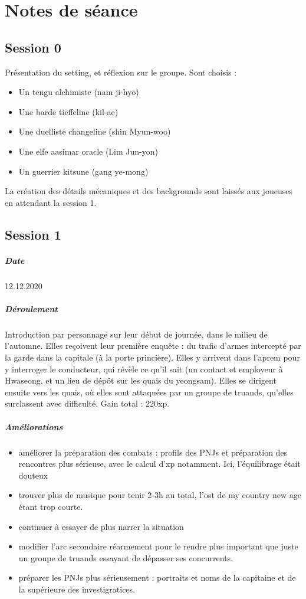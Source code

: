 \documentclass[10pt,a4paper]{book}
\begin{document}
\chapter{Notes de séance}
\section{Session 0}
Présentation du setting, et réflexion sur le groupe. Sont choisis :
\begin{itemize}
\item Un tengu alchimiste (nam ji-hyo)
\item Une barde tieffeline (kil-ae)
\item Une duelliste changeline (shin Myun-woo)
\item Une elfe aasimar oracle (Lim Jun-yon)
\item Un guerrier kitsune (gang ye-mong)
\end{itemize}
La création des détails mécaniques et des backgrounds sont laissés aux joueuses en attendant la session 1.
\section{Session 1}
\paragraph{Date}12.12.2020
\paragraph{Déroulement} Introduction par personnage sur leur début de journée, dans le milieu de l'automne. Elles reçoivent leur première enquête : du trafic d'armes intercepté par la garde dans la capitale (à la porte princière). Elles y arrivent dans l'aprem pour y interroger le conducteur, qui révèle ce qu'il sait (un contact et employeur à Hwaseong, et un lieu de dépôt sur les quais du yeongsam). Elles se dirigent ensuite vers les quais, où elles sont attaquées par un groupe de truands, qu'elles surclassent avec difficulté. Gain total : 220xp.
\paragraph{Améliorations}
\begin{itemize}
\item améliorer la préparation des combats : profils des PNJs et préparation des rencontres plus sérieuse, avec le calcul d'xp notamment. Ici, l'équilibrage était douteux
\item trouver plus de musique pour tenir 2-3h au total, l'ost de my country new age étant trop courte.
\item continuer à essayer de plus narrer la situation
\item modifier l'arc secondaire réarmement pour le rendre plus important que juste un groupe de truands essayant de dépasser ses concurrents.
\item préparer les PNJs plus sérieusement : portraits et noms de la capitaine et de la supérieure des investigratices.
\end{itemize}
\end{document}
